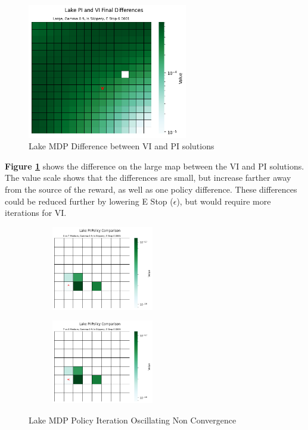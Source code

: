 \documentclass[letterpaper]{article} %
\begin{document}
\begin{figure}[!htb]
\centering
\includegraphics[width=2.75in]{Figures/Lake_PI_and_VI_Final_Differences_Large__Gamma_0_9__Is_Slippery__E_Stop_0_0001.png}
\caption{Lake MDP Difference between VI and PI solutions}
\label{fig:lake_vi_pi_difference}
\end{figure}

\textbf{Figure \ref{fig:lake_vi_pi_difference}} shows the difference on the large map between the VI and PI solutions.  The value scale shows that the differences are small, but increase farther away from the source of the reward, as well as one policy difference.  These differences could be reduced further by lowering E Stop ($\epsilon$), but would require more iterations for VI.

\begin{figure}[!htb]
	\begin{subfigure}[b]{0.25\textwidth}
		\centering
		\includegraphics[width=1.75in]{Figures/Lake_PI_Policy_Comparison_6_vs_7_Medium__Gamma_0_9__Is_Slippery__E_Stop_0_0001.png}
  	\end{subfigure}%
	\begin{subfigure}[b]{0.25\textwidth}
		\centering
		\includegraphics[width=1.75in]{Figures/Lake_PI_Policy_Comparison_7_vs_8_Medium__Gamma_0_9__Is_Slippery__E_Stop_0_0001.png}
  	\end{subfigure}%
\caption{Lake MDP Policy Iteration Oscillating Non Convergence}
\label{fig:lake_pi_oscillation}
\end{figure}
\end{document}
